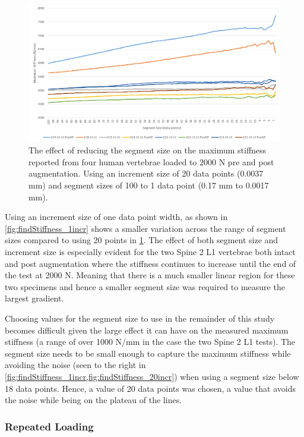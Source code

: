 \begin{figure}[ht!]
  \centering
 
\includegraphics[width=6in]{Chapters/Chapter_HT_images/findStiffness_20incr.png}
  \caption{The effect of reducing the segment size on the maximum stiffness
    reported from four human vertebrae loaded to 2000 N pre and post
    augmentation. Using an increment size of 20 data points (0.0037 mm) and
    segment sizes of 100 to 1 data point (0.17 mm to 0.0017 mm).}
  \label{fig:findStiffness_20incr}
\end{figure}

Using an increment size of one data point width, as shown in
\cref{fig:findStiffness_1incr} shows a smaller variation across the range of
segment sizes compared to using 20 points in \cref{fig:findStiffness_20incr}.
The effect of both segment size and increment
size is especially evident for the two Spine 2 L1 vertebrae both intact and
post
augmentation where the stiffness continues to increase until the end of the
test
at 2000 N. Meaning that there is a much smaller linear region for these two
specimens and hence a smaller segment size was required to measure the largest
gradient.

Choosing values for the segment size to use in the remainder of this study becomes difficult
given the large effect it can have on the measured maximum stiffness (a range
of
over 1000 N/mm in the case the two Spine 2 L1 tests). The segment size needs to
be small enough to capture the maximum stiffness while avoiding the noise (seen
to the right in \cref{fig:findStiffness_1incr,fig:findStiffness_20incr}) when
using a segment size below 18 data points. Hence, a value of 20 data points was
chosen, a value that avoids the noise while being on the plateau of the lines.


\subsubsection{Repeated Loading}

